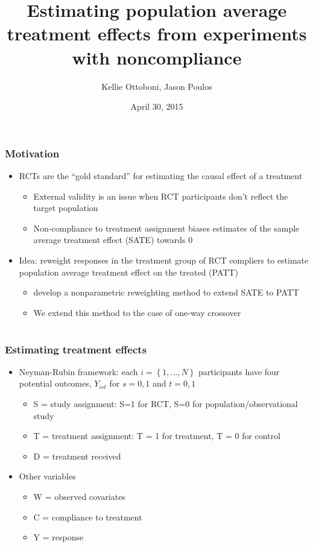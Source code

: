 \documentclass{beamer}
\title[]{Estimating population average treatment effects from experiments with noncompliance}
\author[K. Ottoboni, J. Poulos]{Kellie Ottoboni, Jason Poulos}
\institute[]{Stat 215B}
\date[04/30/15]{April 30, 2015}
\begin{document}
\frame{\titlepage}

\section[Introduction]{}

\begin{frame}
\frametitle{Motivation}
\begin{itemize}
\item RCTs are the ``gold standard'' for estimating the causal effect of a treatment
\begin{itemize}
\item External validity is an issue when RCT participants don't reflect the target population
\item Non-compliance to treatment assignment biases estimates of the sample average treatment effect (SATE) towards $0$
\end{itemize}
\item Idea: reweight responses in the treatment group of RCT compliers to estimate population average treatment effect on the treated (PATT)
\begin{itemize}
\item \cite{Hartman} develop a nonparametric reweighting method to extend SATE to PATT
\item We extend this method to the case of one-way crossover
\end{itemize}
\end{itemize}
\end{frame}

\section[Estimation]{}

\begin{frame}
\frametitle{Estimating treatment effects}
\begin{itemize}
\item Neyman-Rubin framework: each $i = \left\{1, ..., N \right\}$ participants have four potential outcomes, $Y_{ist}$ for $s = 0,1$ and $t = 0,1$
\begin{itemize}
\item S = study assignment: S=1 for RCT, S=0 for population/observational study
\item T = treatment assignment: T = 1 for treatment, T = 0 for control
\item D = treatment received
\end{itemize}
\item Other variables
\begin{itemize}
\item W = observed covariates
\item C = compliance to treatment
\item Y = response
\end{itemize}
\end{itemize}
\end{frame}
\end{document}
